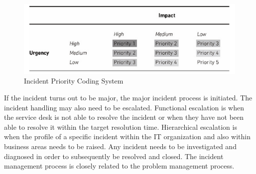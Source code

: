 \begin{figure}[ht]
\begin{center}
\hspace{-0.2cm}\includegraphics[scale=0.4]{ITILIncidentPrioritization.png}
\caption[ITIL Incident Priority Coding System]{Incident Priority Coding System \cite{itilbok}}
\label{fig:ITILIncidentPrioritization}
\end{center}
\end{figure}

If the incident turns out to be major, the major incident process is initiated. The incident handling may also need to be escalated. Functional escalation is when the service desk is not able to resolve the incident or when they have not been able to resolve it within the target resolution time. Hierarchical escalation is when the profile of a specific incident within the IT organization and also within business areas needs to be raised. Any incident needs to be investigated and diagnosed in order to subsequently be resolved and closed. The incident management process is closely related to the problem management process.

